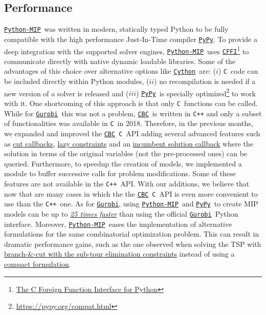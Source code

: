 \documentclass{article}
\def\C{\texttt{C}}
\def\CPP{\texttt{C++}}
\def\Pypy{\href{https://pypy.org}{\texttt{PyPy}}}
\def\Gurobi{\href{www.gurobi.com}{\texttt{Gurobi}\textsuperscript{\textregistered}}}
\def\Cython{\href{https://cython.org/}{\texttt{Cython}}}
\def\CFFI{\href{https://cffi.readthedocs.io}{\texttt{CFFI}}}
\def\CBC{\href{https://github.com/coin-or/cbc}{\texttt{CBC}}}
\def\PythonMIP{\href{https://github.com/coin-or/python-mip}{\texttt{Python-MIP}}}
\begin{document}
\subsection{Performance}
\PythonMIP\ was written in modern, statically typed Python to be fully compatible with the high performance Just-In-Time compiler \Pypy. 
To provide a deep integration with the supported solver engines, \PythonMIP\ uses \CFFI\footnote{\href{https://cffi.readthedocs.io}{The C Foreign Function Interface for Python}} to communicate directly with native dynamic loadable libraries. 
Some of the advantages of this choice over alternative options like \Cython\ are: ($i$) \C\ code can be included directly within Python modules, ($ii$) no recompilation is needed if a new version of a solver is released and ($iii$) \Pypy\ is specially optimized\footnote{\href{https://pypy.org/compat.html}{https://pypy.org/compat.html}} to work with it. 
One shortcoming of this approach is that only \C\ functions can be called. 
While for \Gurobi\ this was not a problem, \CBC\ is written in \texttt{C++} and only a subset of functionalities was available in \C\ in 2018. 
Therefore, in the previous months, we expanded and improved the \CBC\ \C\ API adding several advanced features such as \href{https://python-mip.readthedocs.io/en/latest/custom.html#cut-callback}{cut callbacks}, \href{https://python-mip.readthedocs.io/en/latest/custom.html#lazy-constraints}{lazy constraints} and an \href{https://python-mip.readthedocs.io/en/latest/classes.html#incumbentupdater}{incumbent solution callback} where the solution in terms of the original variables (not the pre-processed ones) can be queried. 
Furthermore, to speedup the creation of models, we implemented a module to buffer successive calls for problem modifications. 
Some of these features are not available in the \CPP\ API. 
With our additions, we believe that now that are many cases in which the the \CBC\ \C\ API is even more convenient to use than the \CPP\ one.
As for \Gurobi, using \PythonMIP\ and \Pypy\ to create MIP models can be up to \href{https://python-mip.readthedocs.io/en/latest/bench.html#n-queens}{ \emph{25 times faster}} than using the official \Gurobi\ Python interface. 
Moreover, \PythonMIP\ eases the implementation of alternative formulations for the same combinatorial optimization problem.
This can result in dramatic performance gains, such as the one observed when solving the TSP with \href{https://github.com/coin-or/python-mip/blob/master/examples/tsp-cuts.py}{branch-\&-cut with the sub-tour elimination constraints} instead of using a \href{https://github.com/coin-or/python-mip/blob/master/examples/tsp-compact.py}{compact formulation}.
\end{document}
